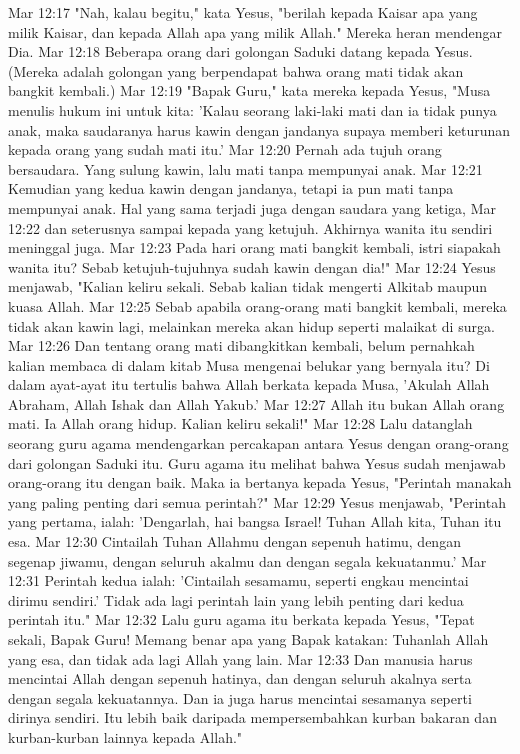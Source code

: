 Mar 12:17  "Nah, kalau begitu," kata Yesus, "berilah kepada Kaisar apa yang milik Kaisar, dan kepada Allah apa yang milik Allah." Mereka heran mendengar Dia.
Mar 12:18  Beberapa orang dari golongan Saduki datang kepada Yesus. (Mereka adalah golongan yang berpendapat bahwa orang mati tidak akan bangkit kembali.)
Mar 12:19  "Bapak Guru," kata mereka kepada Yesus, "Musa menulis hukum ini untuk kita: 'Kalau seorang laki-laki mati dan ia tidak punya anak, maka saudaranya harus kawin dengan jandanya supaya memberi keturunan kepada orang yang sudah mati itu.'
Mar 12:20  Pernah ada tujuh orang bersaudara. Yang sulung kawin, lalu mati tanpa mempunyai anak.
Mar 12:21  Kemudian yang kedua kawin dengan jandanya, tetapi ia pun mati tanpa mempunyai anak. Hal yang sama terjadi juga dengan saudara yang ketiga,
Mar 12:22  dan seterusnya sampai kepada yang ketujuh. Akhirnya wanita itu sendiri meninggal juga.
Mar 12:23  Pada hari orang mati bangkit kembali, istri siapakah wanita itu? Sebab ketujuh-tujuhnya sudah kawin dengan dia!"
Mar 12:24  Yesus menjawab, "Kalian keliru sekali. Sebab kalian tidak mengerti Alkitab maupun kuasa Allah.
Mar 12:25  Sebab apabila orang-orang mati bangkit kembali, mereka tidak akan kawin lagi, melainkan mereka akan hidup seperti malaikat di surga.
Mar 12:26  Dan tentang orang mati dibangkitkan kembali, belum pernahkah kalian membaca di dalam kitab Musa mengenai belukar yang bernyala itu? Di dalam ayat-ayat itu tertulis bahwa Allah berkata kepada Musa, 'Akulah Allah Abraham, Allah Ishak dan Allah Yakub.'
Mar 12:27  Allah itu bukan Allah orang mati. Ia Allah orang hidup. Kalian keliru sekali!"
Mar 12:28  Lalu datanglah seorang guru agama mendengarkan percakapan antara Yesus dengan orang-orang dari golongan Saduki itu. Guru agama itu melihat bahwa Yesus sudah menjawab orang-orang itu dengan baik. Maka ia bertanya kepada Yesus, "Perintah manakah yang paling penting dari semua perintah?"
Mar 12:29  Yesus menjawab, "Perintah yang pertama, ialah: 'Dengarlah, hai bangsa Israel! Tuhan Allah kita, Tuhan itu esa.
Mar 12:30  Cintailah Tuhan Allahmu dengan sepenuh hatimu, dengan segenap jiwamu, dengan seluruh akalmu dan dengan segala kekuatanmu.'
Mar 12:31  Perintah kedua ialah: 'Cintailah sesamamu, seperti engkau mencintai dirimu sendiri.' Tidak ada lagi perintah lain yang lebih penting dari kedua perintah itu."
Mar 12:32  Lalu guru agama itu berkata kepada Yesus, "Tepat sekali, Bapak Guru! Memang benar apa yang Bapak katakan: Tuhanlah Allah yang esa, dan tidak ada lagi Allah yang lain.
Mar 12:33  Dan manusia harus mencintai Allah dengan sepenuh hatinya, dan dengan seluruh akalnya serta dengan segala kekuatannya. Dan ia juga harus mencintai sesamanya seperti dirinya sendiri. Itu lebih baik daripada mempersembahkan kurban bakaran dan kurban-kurban lainnya kepada Allah."
